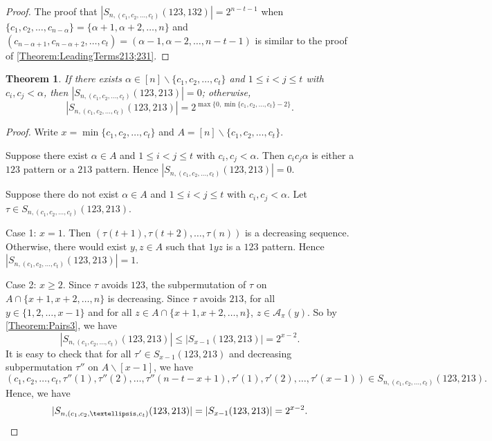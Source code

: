 \documentclass[11pt]{article}
\newtheorem{theorem}{Theorem}[section]
\theoremstyle{definition}
\newcommand{\red}[1]{{\color{red} #1}}
\numberwithin{equation}{section}
\begin{document}
\begin{proof}


    The proof that $|S_{n,(c_1,c_2,\ldots,c_t)}(123,132)|=2^{n-t-1}$ when $\{c_1,c_2,\ldots,c_{n-\alpha}\}=\{\alpha+1,\alpha+2,\ldots,n\}$ and $(c_{n-\alpha+1},c_{n-\alpha+2},\ldots,c_t)=(\alpha-1,\alpha-2,\ldots,n-t-1)$ is similar to the proof of \cref{Theorem:LeadingTerms213;231}.
\end{proof}

\begin{theorem}\label{Theorem:LeadingTerms123AND213}
If there exists $\alpha\in[n]\backslash\{c_1,c_2,\ldots,c_t\}$ and $1\leq i<j\leq t$ with $c_i,c_j<\alpha$, then $|S_{n,(c_1,c_2,\ldots,c_t)}(123,213)|=0$; otherwise,
\[
|S_{n,(c_1,c_2,\ldots,c_t)}(123,213)|=2^{\max\{0,\min\{c_1,c_2,\ldots,c_t\}-2\}}.
\]
\end{theorem}
\begin{proof}
Write $x=\min\{c_1,c_2,\ldots,c_t\}$ and $A=[n]\backslash\{c_1,c_2,\ldots,c_t\}$.

    Suppose there exist $\alpha\in A$ and $1\leq i<j\leq t$ with $c_i,c_j<\alpha$. Then $c_ic_j\alpha$ is either a $123$ pattern or a $213$ pattern. Hence $|S_{n,(c_1,c_2,\ldots,c_t)}(123,213)|=0$.

    Suppose there do not exist $\alpha\in A$ and $1\leq i<j\leq t$ with $c_i,c_j<\alpha$. Let $\tau\in S_{n,(c_1,c_2,\ldots,c_t)}(123,213)$.
    
    Case 1: $x=1$. Then $(\tau(t+1),\tau(t+2),\ldots,\tau(n))$ is a decreasing sequence. Otherwise, there would exist $y,z\in A$ such that $1yz$ is a $123$ pattern. Hence $|S_{n,(c_1,c_2,\ldots,c_t)}(123,213)|=1$.

    Case 2: $x\geq2$.  Since $\tau$ avoids $123$, the subpermutation of $\tau$ on $A\cap\{x+1,x+2,\ldots,n\}$ is decreasing. Since $\tau$ avoids $213$, for all $y\in\{1,2,\ldots,x-1\}$ and for all $z\in A\cap\{x+1,x+2,\ldots,n\}$, $z\in \mathcal{A}_\pi(y)$. So by \cref{Theorem:Pairs3}, we have \[|S_{n,(c_1,c_2,\ldots,c_t)}(123,213)|\leq |S_{x-1}(123,213)|=2^{x-2}.\] It is easy to check that for all $\tau'\in S_{x-1}(123,213)$ and decreasing subpermutation $\tau''$ on $A\backslash[x-1]$, we have \[(c_1,c_2,\ldots,c_t,\tau''(1),\tau''(2),\ldots,\tau''(n-t-x+1),\tau'(1),\tau'(2),\ldots,\tau'(x-1))\in S_{n,(c_1,c_2,\ldots,c_t)}(123,213).\]
Hence, we have \[|S_{n,(c_1,c_2,\ldots,c_t)}(123,213)|=|S_{x-1}(123,213)|=2^{x-2}.\qedhere\]
\end{proof}
\end{document}
